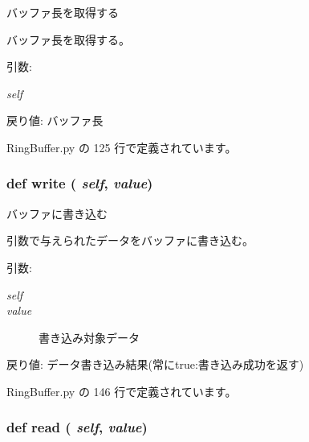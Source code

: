 バッファ長を取得する 

バッファ長を取得する。

\begin{Desc}
\item[引数:]
\begin{description}
\item[{\em self}]\end{description}
\end{Desc}
\begin{Desc}
\item[戻り値:]バッファ長 \end{Desc}


 RingBuffer.py の 125 行で定義されています。
\subsubsection{\setlength{\rightskip}{0pt plus 5cm}def write ( {\em self},  {\em value})}\label{classsource__py_1_1_ring_buffer_1_1_ring_buffer_8c7fc40f1124fcf3f5ee7116cd62f413}


バッファに書き込む 

引数で与えられたデータをバッファに書き込む。

\begin{Desc}
\item[引数:]
\begin{description}
\item[{\em self}]\item[{\em value}]書き込み対象データ\end{description}
\end{Desc}
\begin{Desc}
\item[戻り値:]データ書き込み結果(常にtrue:書き込み成功を返す) \end{Desc}


 RingBuffer.py の 146 行で定義されています。
\subsubsection{\setlength{\rightskip}{0pt plus 5cm}def read ( {\em self},  {\em value})}\label{classsource__py_1_1_ring_buffer_1_1_ring_buffer_fcea8c9091d60bee0f6fb79abb6e1cca}


